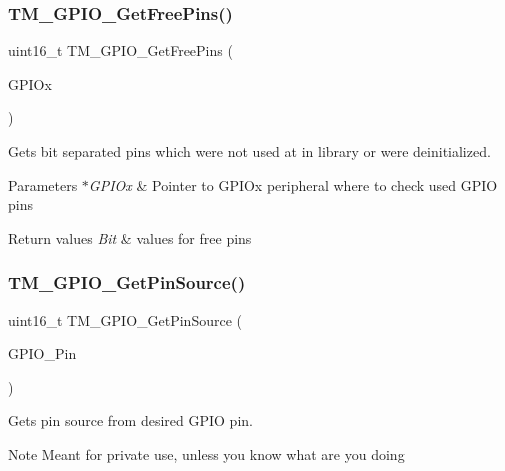 \subsubsection{\texorpdfstring{T\+M\+\_\+\+G\+P\+I\+O\+\_\+\+Get\+Free\+Pins()}{TM\_GPIO\_GetFreePins()}}
{\footnotesize\ttfamily uint16\+\_\+t T\+M\+\_\+\+G\+P\+I\+O\+\_\+\+Get\+Free\+Pins (\begin{DoxyParamCaption}\item[{G\+P\+I\+O\+\_\+\+Type\+Def $\ast$}]{G\+P\+I\+Ox }\end{DoxyParamCaption})}



Gets bit separated pins which were not used at in library or were deinitialized. 


\begin{DoxyParams}{Parameters}
{\em $\ast$\+G\+P\+I\+Ox} & Pointer to G\+P\+I\+Ox peripheral where to check used G\+P\+IO pins \\
\hline
\end{DoxyParams}

\begin{DoxyRetVals}{Return values}
{\em Bit} & values for free pins \\
\hline
\end{DoxyRetVals}
\mbox{\label{group___t_m___g_p_i_o___functions_ga29aaed3ba7054d4c3a3fed55012403e5}} 
\subsubsection{\texorpdfstring{T\+M\+\_\+\+G\+P\+I\+O\+\_\+\+Get\+Pin\+Source()}{TM\_GPIO\_GetPinSource()}}
{\footnotesize\ttfamily uint16\+\_\+t T\+M\+\_\+\+G\+P\+I\+O\+\_\+\+Get\+Pin\+Source (\begin{DoxyParamCaption}\item[{uint16\+\_\+t}]{G\+P\+I\+O\+\_\+\+Pin }\end{DoxyParamCaption})}



Gets pin source from desired G\+P\+IO pin. 

\begin{DoxyNote}{Note}
Meant for private use, unless you know what are you doing 
\end{DoxyNote}

